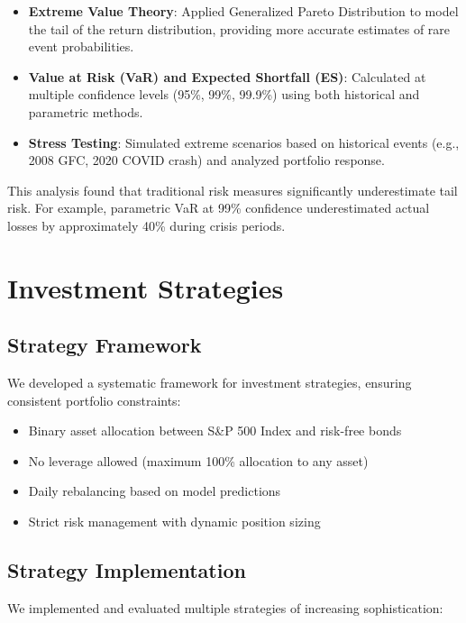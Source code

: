\documentclass[10pt]{article}
\begin{document}
\begin{itemize}
    \item \textbf{Extreme Value Theory}: Applied Generalized Pareto Distribution to model the tail of the return distribution, providing more accurate estimates of rare event probabilities.
    
    \item \textbf{Value at Risk (VaR) and Expected Shortfall (ES)}: Calculated at multiple confidence levels (95\%, 99\%, 99.9\%) using both historical and parametric methods.
    
    \item \textbf{Stress Testing}: Simulated extreme scenarios based on historical events (e.g., 2008 GFC, 2020 COVID crash) and analyzed portfolio response.
\end{itemize}

This analysis found that traditional risk measures significantly underestimate tail risk. For example, parametric VaR at 99\% confidence underestimated actual losses by approximately 40\% during crisis periods.

\section{Investment Strategies}
\subsection{Strategy Framework}
We developed a systematic framework for investment strategies, ensuring consistent portfolio constraints:

\begin{itemize}
    \item Binary asset allocation between S\&P 500 Index and risk-free bonds
    \item No leverage allowed (maximum 100\% allocation to any asset)
    \item Daily rebalancing based on model predictions
    \item Strict risk management with dynamic position sizing
\end{itemize}

\subsection{Strategy Implementation}
We implemented and evaluated multiple strategies of increasing sophistication:
\end{document}
